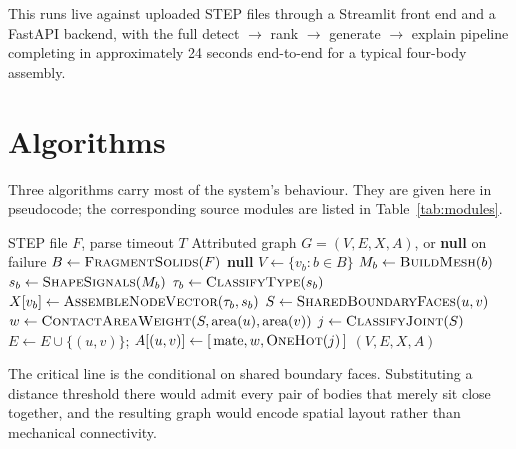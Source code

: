 \documentclass[12pt,oneside,a4paper]{report}
\begin{document}
This runs live against uploaded STEP files through a Streamlit front end and
a FastAPI backend, with the full detect $\to$ rank $\to$ generate $\to$
explain pipeline completing in approximately 24 seconds end-to-end for a
typical four-body assembly.

\section{Algorithms}

Three algorithms carry most of the system's behaviour. They are given here in
pseudocode; the corresponding source modules are listed in
Table~\ref{tab:modules}.

\begin{algorithm}[h]
\caption{STEP file to attributed assembly graph}
\label{alg:graphbuild}
\begin{algorithmic}[1]
\Require STEP file $F$, parse timeout $T$
\Ensure Attributed graph $G=(V,E,X,A)$, or \textbf{null} on failure
\State $B \gets \textsc{FragmentSolids}(F)$ 
  \State \Return \textbf{null} 
\EndIf
\State $V \gets \{v_b : b \in B\}$
  \State $M_b \gets \textsc{BuildMesh}(b)$
  \State $s_b \gets \textsc{ShapeSignals}(M_b)$ 
  \State $\tau_b \gets \textsc{ClassifyType}(s_b)$ 
  \State $X[v_b] \gets \textsc{AssembleNodeVector}(\tau_b, s_b)$ 
\EndFor
{}
  \State $S \gets \textsc{SharedBoundaryFaces}(u,v)$
   
    \State $w \gets \textsc{ContactAreaWeight}(S, \mathrm{area}(u), \mathrm{area}(v))$
    \State $j \gets \textsc{ClassifyJoint}(S)$ 
    \State $E \gets E \cup \{(u,v)\}$; \quad $A[(u,v)] \gets [\,\mathrm{mate}, w, \textsc{OneHot}(j)\,]$
  \EndIf
\EndFor
\State \Return $(V,E,X,A)$
\end{algorithmic}
\end{algorithm}

The critical line is the conditional on shared boundary faces. Substituting a
distance threshold there would admit every pair of bodies that merely sit close
together, and the resulting graph would encode spatial layout rather than
mechanical connectivity.
\end{document}
